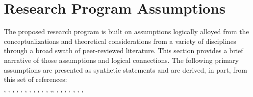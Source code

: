

\section{Research Program Assumptions}
The proposed research program is built on assumptions logically alloyed from the conceptualizations and theoretical considerations from a variety of disciplines through a broad swath of peer-reviewed literature. This section provides a brief narrative of those assumptions and logical connections. The following primary assumptions are presented as synthetic statements and are derived, in part, from this set of references:\\

\noindent \citep{ingham_interactions_1985}, \citep{maeder_soil_2002}, \citep{polis_food_1996}, \citep{van_der_heijden_unseen_2008}, \citep{lavelle_faunal_1997-1}, \citep{kladivko_tillage_2001}, \citep{doran_soil_2000-1}, \citep{bongers_nematode_1999}, \citep{brussaard_soil_1998}, \citep{coleman_peds_2008}, \citep{sackett_linking_2010}, \citep{kardol_how_2010},\citep{van_der_putten_empirical_2009}, \citep{bardgett_belowground_2014}, \citep{scheller_forest_2004}, \citep{williams_simple_2010}, \citep{fath_ecological_2007}, \citep{harte_maximum_2011}, \citep{gianinazzi_impact_1994}, \citep{eigen_hypercycle_1979}, \citep{nicolis_exploring_1989}

